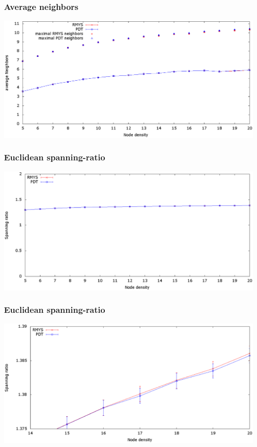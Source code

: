 \documentclass[compress]{beamer}
\begin{document}
\begin{frame} 
\frametitle{Average neighbors}
\center	\includegraphics[width=1.0\linewidth]{RMYS_PDT_avrNeighbors.eps}
\end{frame}

\begin{frame} 
\frametitle{Euclidean spanning-ratio}
\center	\includegraphics[width=1.0\linewidth]{RMYS_PDT_SpanningRatio.eps}
\end{frame}

\begin{frame} 
\frametitle{Euclidean spanning-ratio}
\center	\includegraphics[width=1.0\linewidth]{RMYS_PDT_SpanningRatio-hd.eps}
\end{frame}
\end{document}
